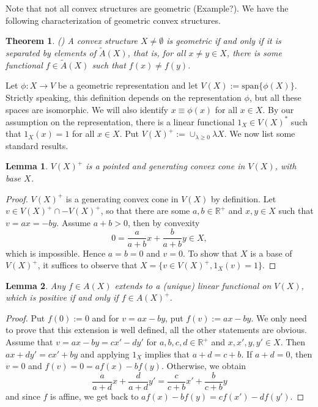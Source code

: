 \documentclass[12pt]{article}
\newtheorem{lemma}{Lemma}
\newtheorem{thm}{Theorem}
\newcommand{\<}{\langle}
\begin{document}
 Note that not all convex structures are geometric (Example?). We have the following characterization of geometric convex structures.
\begin{thm}(\cite[Thm. 2.2]{gudder}) \label{thm:gudder} A convex structure $X\neq \emptyset$ is geometric if and only if it is separated by elements of $\widetilde A(X)$, 
that is, for all $x\ne y\in X$, there is some functional $f\in \widetilde A(X)$ such that $f(x)\ne f(y)$. 
\end{thm}


Let $\phi:X\to V$ be a geometric representation and let $V(X):=\mathrm{span}\{\phi(X)\}$. Strictly speaking, this definition depends on the representation $\phi$, but all
 these  spaces  are isomorphic. We will also identify $x\equiv \phi(x)$ for all $x\in X$. By our assumption on the representation, there is a linear functional $1_X\in V(X)^*$ such that 
 $1_X(x)=1$ for all $x\in X$. Put $V(X)^+:=\cup_{\lambda\ge 0} \lambda X$. We now list some standard results.

\begin{lemma} %
$V(X)^+$ is a pointed and generating convex cone in $V(X)$, with base $X$.

\end{lemma}

\begin{proof} $V(X)^+$ is a generating convex cone in $V(X)$ by definition. Let $v\in V(X)^+\cap -V(X)^+$, so that there are some $a,b\in \mathbb R^+$ and $x,y\in X$ such that $v=ax=-by$. Assume $a+b>0$, then by convexity 
\[
0=\frac a{a+b}x+\frac b{a+b}y\in X,
\]
 which is impossible. Hence $a=b=0$ and $v=0$. To show that $X$ is a base of $V(X)^+$, it suffices to observe that $X=\{v\in V(X)^+, 1_X(v)=1\}$.


\end{proof}



\begin{lemma}\label{lemma:extension} Any $f\in A(X)$ extends to a (unique) linear functional on $V(X)$, which is positive if and only if $f\in A(X)^+$.

\end{lemma}

\begin{proof} Put $f(0):=0$ and for $v=ax-by$, put $f(v):=ax-by$. We only need to prove that this extension is well defined, all the other  statements are obvious. Assume that $v=ax-by=cx'-dy'$ for $a,b,c,d\in \mathbb R^+$ and $x,x',y,y'\in X$. Then $ax+dy'=cx'+by$ and applying $1_X$ implies that $a+d=c+b$.
 If $a+d=0$, then $v=0$ and $f(v)=0=af(x)-bf(y)$. Otherwise, we obtain 
 \[
\frac a{a+d}x+ \frac d{a+d}y'=\frac c{c+b} x'+\frac b{c+b} y
 \]
and since $f$ is affine, we get back to $af(x)-bf(y)=cf(x')-df(y')$. 
\end{proof}
\end{document}
